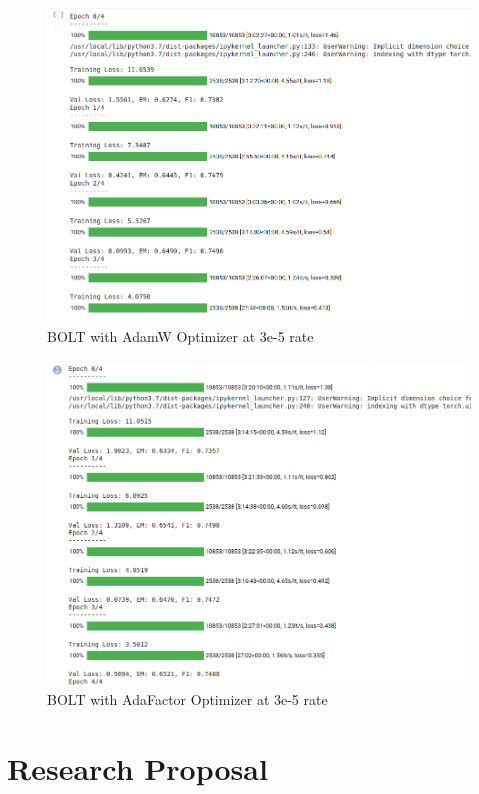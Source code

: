 \documentclass[a4paper,12pt]{report}
\begin{document}
\begin{appendices}
      \begin{figure}[!h]
      	\centering
      	\includegraphics[scale=0.35]{../images/AdamW3e.png}
      	\caption{BOLT with AdamW Optimizer at 3e-5 rate}\label{adam3e}
      \end{figure}
      
      \begin{figure}[!h]
      	\centering
      	\includegraphics[scale=0.35]{../images/AdaFactor3e.png}
      	\caption{BOLT with AdaFactor Optimizer at 3e-5 rate}\label{ada3e}
      \end{figure}
         \chapter{Research Proposal}\label{crp}
         	

    \end{appendices}



\end{document}

